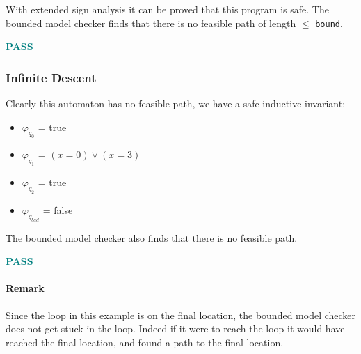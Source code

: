 \documentclass[letterpaper,12pt]{article}
\begin{document}
With extended sign analysis it can be proved that this program is safe. The bounded model checker finds that there is no feasible path of length $\leq $ \texttt{bound}.

\textbf{\textcolor{teal}{PASS}}

\subsubsection{Infinite Descent}

  
Clearly this automaton has no feasible path, we have a safe inductive invariant:
\begin{itemize}
\item $\varphi _{q_0}$ = true
\item $\varphi _{q_1}$ = $(x=0) \vee (x=3)$
\item $\varphi _{q_2}$ = true
\item $\varphi _{q_{bad}}$ = false
\end{itemize}   
The bounded model checker also finds that there is no feasible path.

\textbf{\textcolor{teal}{PASS}}
\paragraph{Remark}Since the loop in this example is on the final location, the bounded model checker does not get stuck in the loop. Indeed if it were to reach the loop it would have reached the final location, and found a path to the final location.
\end{document}
